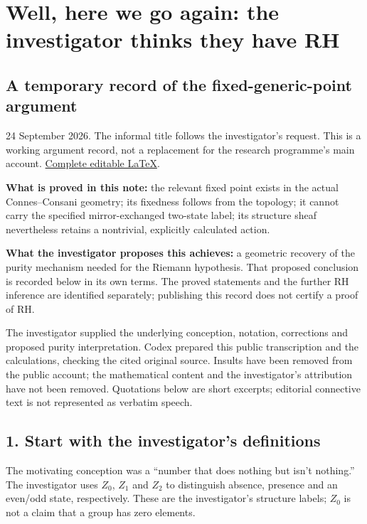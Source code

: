 \documentclass[
]{article}
\author{}
\date{}
\begin{document}
\section{Well, here we go again: the investigator thinks they have
RH}\label{well-here-we-go-again-the-investigator-thinks-they-have-rh}

\subsection{A temporary record of the fixed-generic-point
argument}\label{a-temporary-record-of-the-fixed-generic-point-argument}

24 September 2026. The informal title follows the investigator's
request. This is a working argument record, not a replacement for the
research programme's main account. \href{README.tex}{Complete editable
LaTeX}.

\textbf{What is proved in this note:} the relevant fixed point exists in
the actual Connes--Consani geometry; its fixedness follows from the
topology; it cannot carry the specified mirror-exchanged two-state
label; its structure sheaf nevertheless retains a nontrivial, explicitly
calculated action.

\textbf{What the investigator proposes this achieves:} a geometric
recovery of the purity mechanism needed for the Riemann hypothesis. That
proposed conclusion is recorded below in its own terms. The proved
statements and the further RH inference are identified separately;
publishing this record does not certify a proof of RH.

The investigator supplied the underlying conception, notation,
corrections and proposed purity interpretation. Codex prepared this
public transcription and the calculations, checking the cited original
source. Insults have been removed from the public account; the
mathematical content and the investigator's attribution have not been
removed. Quotations below are short excerpts; editorial connective text
is not represented as verbatim speech.

\subsection{1. Start with the investigator's
definitions}\label{start-with-the-investigators-definitions}

The motivating conception was a ``number that does nothing but isn't
nothing.'' The investigator uses \(Z_0\), \(Z_1\) and \(Z_2\) to
distinguish absence, presence and an even/odd state, respectively. These
are the investigator's structure labels; \(Z_0\) is not a claim that a
group has zero elements.
\end{document}
